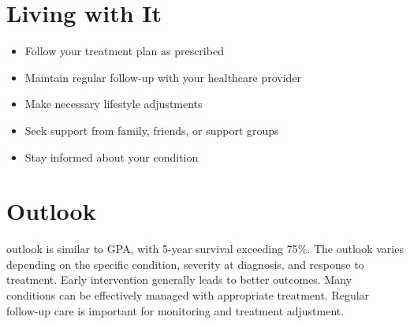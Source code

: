 \section{Living with It}
\begin{itemize}[noitemsep]
  \item Follow your treatment plan as prescribed
  \item Maintain regular follow-up with your healthcare provider
  \item Make necessary lifestyle adjustments
  \item Seek support from family, friends, or support groups
  \item Stay informed about your condition
\end{itemize}
\section{Outlook}
outlook is similar to GPA, with 5-year survival exceeding 75\%. The outlook varies depending on the specific condition, severity at diagnosis, and response to treatment. Early intervention generally leads to better outcomes. Many conditions can be effectively managed with appropriate treatment. Regular follow-up care is important for monitoring and treatment adjustment.
